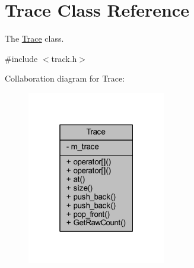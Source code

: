 \hypertarget{class_trace}{}\section{Trace Class Reference}
\label{class_trace}


The \mbox{\hyperlink{class_trace}{Trace}} class.  




{\ttfamily \#include $<$track.\+h$>$}



Collaboration diagram for Trace\+:\nopagebreak
\begin{figure}[H]
\begin{center}
\leavevmode
\includegraphics[width=172pt]{class_trace__coll__graph}
\end{center}
\end{figure}
